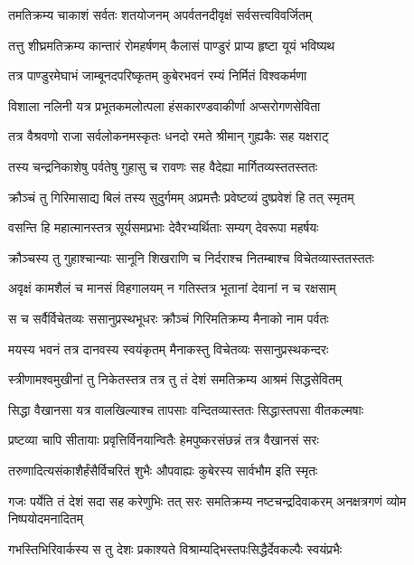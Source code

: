 \twolineshloka
{तमतिक्रम्य चाकाशं सर्वतः शतयोजनम्}
{अपर्वतनदीवृक्षं सर्वसत्त्वविवर्जितम्} %

\twolineshloka
{तत्तु शीघ्रमतिक्रम्य कान्तारं रोमहर्षणम्}
{कैलासं पाण्डुरं प्राप्य हृष्टा यूयं भविष्यथ} %

\twolineshloka
{तत्र पाण्डुरमेघाभं जाम्बूनदपरिष्कृतम्}
{कुबेरभवनं रम्यं निर्मितं विश्वकर्मणा} %

\twolineshloka
{विशाला नलिनी यत्र प्रभूतकमलोत्पला}
{हंसकारण्डवाकीर्णा अप्सरोगणसेविता} %

\twolineshloka
{तत्र वैश्रवणो राजा सर्वलोकनमस्कृतः}
{धनदो रमते श्रीमान् गुह्यकैः सह यक्षराट्} %

\twolineshloka
{तस्य चन्द्रनिकाशेषु पर्वतेषु गुहासु च}
{रावणः सह वैदेह्या मार्गितव्यस्ततस्ततः} %

\twolineshloka
{क्रौञ्चं तु गिरिमासाद्य बिलं तस्य सुदुर्गमम्}
{अप्रमत्तैः प्रवेष्टव्यं दुष्प्रवेशं हि तत् स्मृतम्} %

\twolineshloka
{वसन्ति हि महात्मानस्तत्र सूर्यसमप्रभाः}
{देवैरभ्यर्थिताः सम्यग् देवरूपा महर्षयः} %

\twolineshloka
{क्रौञ्चस्य तु गुहाश्चान्याः सानूनि शिखराणि च}
{निर्दराश्च नितम्बाश्च विचेतव्यास्ततस्ततः} %

\twolineshloka
{अवृक्षं कामशैलं च मानसं विहगालयम्}
{न गतिस्तत्र भूतानां देवानां न च रक्षसाम्} %

\twolineshloka
{स च सर्वैर्विचेतव्यः ससानुप्रस्थभूधरः}
{क्रौञ्चं गिरिमतिक्रम्य मैनाको नाम पर्वतः} %

\twolineshloka
{मयस्य भवनं तत्र दानवस्य स्वयंकृतम्}
{मैनाकस्तु विचेतव्यः ससानुप्रस्थकन्दरः} %

\twolineshloka
{स्त्रीणामश्वमुखीनां तु निकेतस्तत्र तत्र तु}
{तं देशं समतिक्रम्य आश्रमं सिद्धसेवितम्} %

\twolineshloka
{सिद्धा वैखानसा यत्र वालखिल्याश्च तापसाः}
{वन्दितव्यास्ततः सिद्धास्तपसा वीतकल्मषाः} %

\twolineshloka
{प्रष्टव्या चापि सीतायाः प्रवृत्तिर्विनयान्वितैः}
{हेमपुष्करसंछन्नं तत्र वैखानसं सरः} %

\twolineshloka
{तरुणादित्यसंकाशैर्हंसैर्विचरितं शुभैः}
{औपवाह्यः कुबेरस्य सार्वभौम इति स्मृतः} %

\threelineshloka
{गजः पर्येति तं देशं सदा सह करेणुभिः}
{तत् सरः समतिक्रम्य नष्टचन्द्रदिवाकरम्}
{अनक्षत्रगणं व्योम निष्पयोदमनादितम्} %

\twolineshloka
{गभस्तिभिरिवार्कस्य स तु देशः प्रकाश्यते}
{विश्राम्यद्भिस्तपःसिद्धैर्देवकल्पैः स्वयंप्रभैः} %


